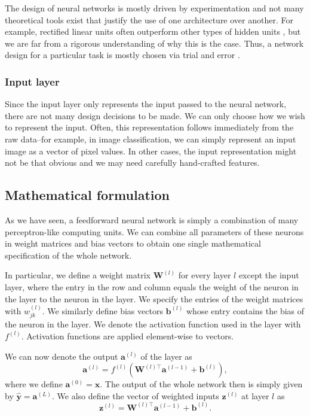 The design of neural networks is mostly driven by experimentation and not many theoretical tools exist that justify the use of one architecture over another. For example, rectified linear units often outperform other types of hidden units \cite{DBLP:journals/jmlr/GlorotBB11 ,DBLP:conf/nips/KrizhevskySH12}, but we are far from a rigorous understanding of why this is the case. Thus, a network design for a particular task is mostly chosen via trial and error \cite[Ch.\,6,\,pp.\,185-187]{DBLP:books/daglib/0040158}.

\subsubsection{Input layer}
Since the input layer only represents the input passed to the neural network, there are not many design decisions to be made. We can only choose how we wish to represent the input. Often, this representation follows immediately from the raw data--for example, in image classification, we can simply represent an input image as a vector of pixel values. In other cases, the input representation might not be that obvious and we may need carefully hand-crafted features.

\subsection{Mathematical formulation}
As we have seen, a feedforward neural network is simply a combination of many perceptron-like computing units. We can combine all parameters of these neurons in weight matrices and bias vectors to obtain one single mathematical specification of the whole network.

In particular, we define a weight matrix $\bm{W}^{(l)}$ for every layer $l$ except the input layer, where the entry in the  row and  column equals the weight of the  neuron in the  layer to the  neuron in the  layer. We specify the entries of the weight matrices with $w_{jk}^{(l)}$. We similarly define bias vectors $\bm{b}^{(l)}$ whose  entry contains the bias of the  neuron in the  layer. We denote the activation function used in the  layer with $f^{(l)}$. Activation functions are applied element-wise to vectors.

We can now denote the output $\bm{a}^{(l)}$ of the  layer as
\begin{equation}
\bm{a}^{(l)} = f^{(l)}\left(\bm{W}^{(l)\top}\bm{a}^{(l-1)}+\bm{b}^{(l)}\right),
\end{equation}
where we define $\bm{a}^{(0)} = \bm{x}$. The output of the whole network then is simply given by $\hat{\bm{y}} = \bm{a}^{(L)}$. We also define the vector of weighted inputs $\bm{z}^{(l)}$ at layer $l$ as
\begin{equation}
\bm{z}^{(l)} = \bm{W}^{(l)\top}\bm{a}^{(l-1)}+\bm{b}^{(l)}.
\end{equation}

